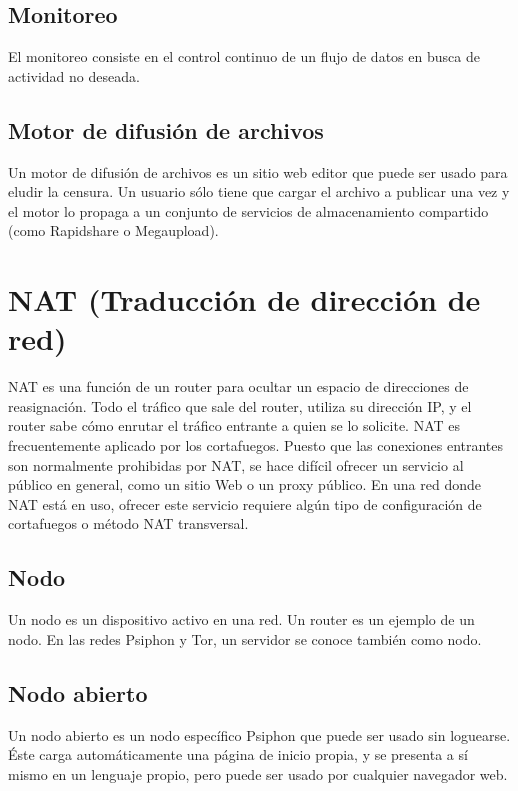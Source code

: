 \subsection{Monitoreo}\label{monitoreo}

El monitoreo consiste en el control continuo de un flujo de datos en
busca de actividad no deseada.

\subsection{Motor de difusión de
archivos}\label{motor-de-difusiuxf3n-de-archivos}

Un motor de difusión de archivos es un sitio web editor que puede ser
usado para eludir la censura. Un usuario sólo tiene que cargar el
archivo a publicar una vez y el motor lo propaga a un conjunto de
servicios de almacenamiento compartido (como Rapidshare o Megaupload).

\section{NAT (Traducción de dirección de
red)}\label{nat-traducciuxf3n-de-direcciuxf3n-de-red}

NAT es una función de un router para ocultar un espacio de direcciones
de reasignación. Todo el tráfico que sale del router, utiliza su
dirección IP, y el router sabe cómo enrutar el tráfico entrante a quien
se lo solicite. NAT es frecuentemente aplicado por los cortafuegos.
Puesto que las conexiones entrantes son normalmente prohibidas por NAT,
se hace difícil ofrecer un servicio al público en general, como un sitio
Web o un proxy público. En una red donde NAT está en uso, ofrecer este
servicio requiere algún tipo de configuración de cortafuegos o método
NAT transversal.

\subsection{Nodo}\label{nodo}

Un nodo es un dispositivo activo en una red. Un router es un ejemplo de
un nodo. En las redes Psiphon y Tor, un servidor se conoce también como
nodo.

\subsection{Nodo abierto}\label{nodo-abierto}

Un nodo abierto es un nodo específico Psiphon que puede ser usado sin
loguearse. Éste carga automáticamente una página de inicio propia, y se
presenta a sí mismo en un lenguaje propio, pero puede ser usado por
cualquier navegador web.

